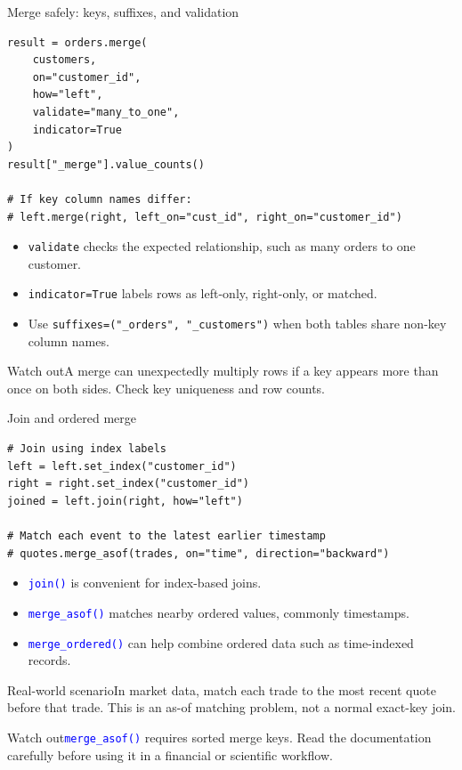 \documentclass[aspectratio=169,10pt]{beamer}
\newcommand{\scenario}[1]{\begin{block}{Real-world scenario}#1\end{block}}
\newcommand{\pitfall}[1]{\begin{alertblock}{Watch out}#1\end{alertblock}}
\newcommand{\method}[1]{\texttt{\textcolor{Blue}{#1}}}
\begin{document}
\begin{frame}[fragile]{Merge safely: keys, suffixes, and validation}
\begin{lstlisting}
result = orders.merge(
    customers,
    on="customer_id",
    how="left",
    validate="many_to_one",
    indicator=True
)
result["_merge"].value_counts()

# If key column names differ:
# left.merge(right, left_on="cust_id", right_on="customer_id")
\end{lstlisting}
\begin{itemize}
\item \texttt{validate} checks the expected relationship, such as many orders to one customer.
\item \texttt{indicator=True} labels rows as left-only, right-only, or matched.
\item Use \texttt{suffixes=("\_orders", "\_customers")} when both tables share non-key column names.
\end{itemize}
\pitfall{A merge can unexpectedly multiply rows if a key appears more than once on both sides. Check key uniqueness and row counts.}
\end{frame}

\begin{frame}[fragile]{Join and ordered merge}
\begin{lstlisting}
# Join using index labels
left = left.set_index("customer_id")
right = right.set_index("customer_id")
joined = left.join(right, how="left")

# Match each event to the latest earlier timestamp
# quotes.merge_asof(trades, on="time", direction="backward")
\end{lstlisting}
\begin{itemize}
\item \method{join()} is convenient for index-based joins.
\item \method{merge\_asof()} matches nearby ordered values, commonly timestamps.
\item \method{merge\_ordered()} can help combine ordered data such as time-indexed records.
\end{itemize}
\scenario{In market data, match each trade to the most recent quote before that trade. This is an as-of matching problem, not a normal exact-key join.}
\pitfall{\method{merge\_asof()} requires sorted merge keys. Read the documentation carefully before using it in a financial or scientific workflow.}
\end{frame}
\end{document}
